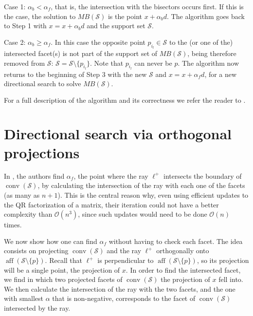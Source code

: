 \begin{description}
\begin{description}
		\smallskip
		Case 1: $\alpha_b<\alpha_f$, that is, the intersection with the bisectors occurs first. If this is the case, the solution to $MB({\mathcal{S}})$ is the point $x+\alpha_b d$. The algorithm goes back to Step 1 with $x=x+\alpha_b d$ and the support set ${\mathcal{S}}$.
	
		\smallskip
		Case 2: $\alpha_b\geq\alpha_f$. In this case the opposite point $p_{i_l}\in {\mathcal{S}}$ to the (or one of the) intersected facet(s) is not part of the support set of $MB({\mathcal{S}})$, being therefore removed from ${\mathcal{S}}$: ${\mathcal{S}} = {\mathcal{S}}\setminus\{p_{i_l}\}$. Note that $p_{i_l}$ can never be $p$. The algorithm now returns to the beginning of Step 3 with the new ${\mathcal{S}}$ and $x=x + \alpha_f d$, for a new directional search to solve $MB({\mathcal{S}})$.
	\end{description}
\end{description}	

\noindent For a full description of the algorithm and its correctness we refer the reader to \cite{Dearing09}.

\section{Directional search via orthogonal projections}\label{sec:LineSearch}

In \cite{Dearing09}, the authors find $\alpha_f$, the point where the ray $\ell^+$ intersects the boundary of ${\operatorname{conv}} ({\mathcal{S}})$, by calculating the intersection of the ray with each one of the facets (as many as $n+1$). This is the central reason why, even using efficient updates to the QR factorization of a matrix, their iteration could not have a better complexity than ${\mathcal{O}}(n^3)$, since such updates would need to be done ${\mathcal{O}}(n)$ times. 

\smallskip

We now show how one can find $\alpha_f$ without having to check each facet. The idea consists on projecting ${\operatorname{conv}}({\mathcal{S}})$ and the ray $\ell^+$ orthogonally onto ${\operatorname{aff}}({\mathcal{S}}\setminus\{{{p}}\})$. Recall that $\ell^+$ is perpendicular to ${\operatorname{aff}}({\mathcal{S}}\setminus\{{{p}}\})$, so its projection will be a single point, the projection of $x$. In order to find the intersected facet, we find in which two projected facets of ${\operatorname{conv}}({\mathcal{S}})$ the projection of $x$ fell into. We then calculate the intersection of the ray with the two facets, and the one with smallest $\alpha$ that is non-negative, corresponds to the facet of ${\operatorname{conv}}({\mathcal{S}})$ intersected by the ray.

